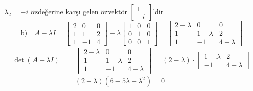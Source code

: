 \documentclass[11pt,a4paper]{article}
\begin{document}
\begin{cozum}
\[\]
\underline{$\lambda_2=-i$} özdeğerine karşı gelen özvektör \underline{$\begin{bmatrix}1\\-i\end{bmatrix}$}'dir
\[
  \text{b)}\quad A-\lambda I=\begin{bmatrix}2&0&0\\1&1&2\\1&-1&4\end{bmatrix}
  -\lambda\begin{bmatrix}1&0&0\\0&1&0\\0&0&1\end{bmatrix}
  =\begin{bmatrix}2-\lambda&0&0\\1&1-\lambda&2\\1&-1&4-\lambda\end{bmatrix}
\]
\begin{align*}
  \det(A-\lambda I)&=\begin{vmatrix}2-\lambda&0&0\\1&1-\lambda&2\\1&-1&4-\lambda\end{vmatrix}
  =(2-\lambda)\cdot\begin{vmatrix}1-\lambda&2\\-1&4-\lambda\end{vmatrix}\\
  &=(2-\lambda)(6-5\lambda+\lambda^2)=0
\end{align*}


\end{cozum}
\end{document}
